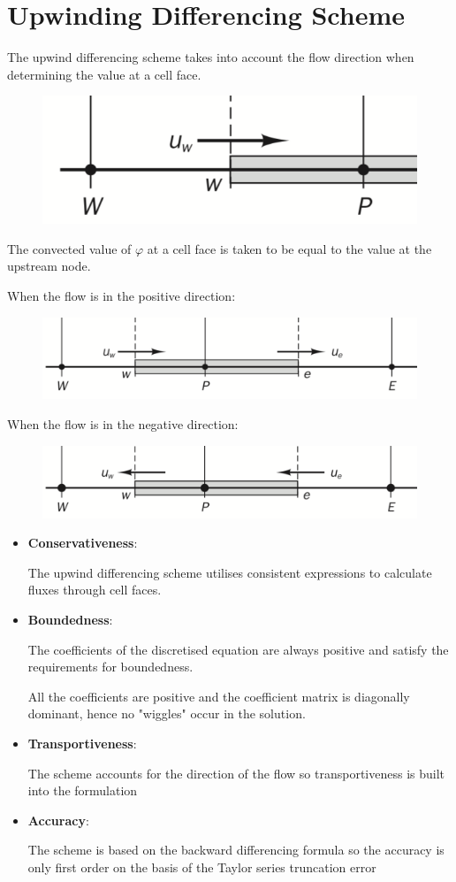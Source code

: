 \documentclass[a4paper, 15pt]{article}
\begin{document}
\section{Upwinding Differencing Scheme}

The
upwind differencing scheme takes into account the flow direction
when determining the value at a cell face. 
\begin{figure}[H]
	\centering
	\includegraphics[width=0.3\linewidth]{fig/screenshot016}
	\label{fig:screenshot016}
\end{figure}

\begin{tcolorbox}[colback=red!5!white,colframe=red!75!black,title=Take Home Message]
	The
	convected value of $\varphi$ at a cell face is taken to be equal to the value at the upstream node.
\end{tcolorbox}
When the flow is in the positive direction:
\begin{figure}[H]
	\centering
	\includegraphics[width=0.5\linewidth]{fig/screenshot017}
	\label{fig:screenshot017}
\end{figure}
When the flow is in the negative direction:
\begin{figure}[H]
	\centering
	\includegraphics[width=0.5\linewidth]{fig/screenshot018}
	\label{fig:screenshot018}
\end{figure}
	\begin{itemize}
	\item \textbf{Conservativeness}:
	
	The upwind differencing scheme utilises consistent expressions to calculate
	fluxes through cell faces.
	
	\item \textbf{Boundedness}:

	The coefficients of the discretised equation are always positive and satisfy the
	requirements for boundedness. 
	
	All the coefficients are
	positive and the coefficient matrix is diagonally dominant, hence no "wiggles" occur in the
	solution.
	
	\item \textbf{Transportiveness}:
	
	The scheme accounts for the direction of the flow so transportiveness is built
	into the formulation
	
	
	\item \textbf{Accuracy}:
	
	The scheme is based on the backward differencing formula so the accuracy is only
	first order on the basis of the Taylor series truncation error
\end{itemize}
\end{document}

